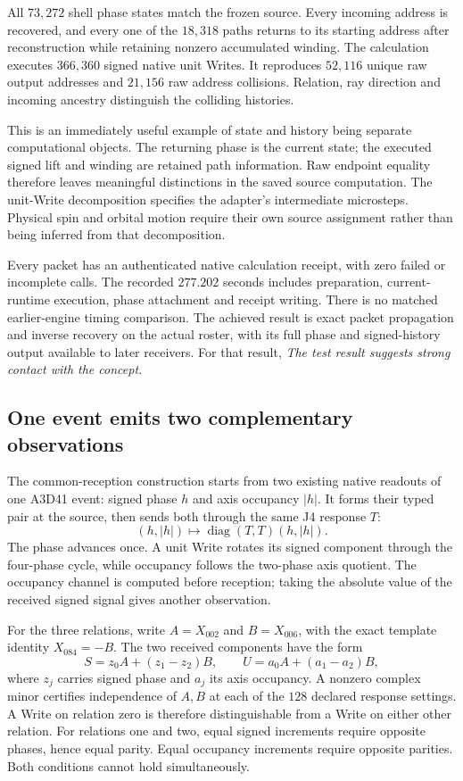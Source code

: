 All $73{,}272$ shell phase states match the frozen source. Every incoming address is recovered, and every one of the $18{,}318$ paths returns to its starting address after reconstruction while retaining nonzero accumulated winding. The calculation executes $366{,}360$ signed native unit Writes. It reproduces $52{,}116$ unique raw output addresses and $21{,}156$ raw address collisions. Relation, ray direction and incoming ancestry distinguish the colliding histories.

This is an immediately useful example of state and history being separate computational objects. The returning phase is the current state; the executed signed lift and winding are retained path information. Raw endpoint equality therefore leaves meaningful distinctions in the saved source computation. The unit-Write decomposition specifies the adapter's intermediate microsteps. Physical spin and orbital motion require their own source assignment rather than being inferred from that decomposition.

Every packet has an authenticated native calculation receipt, with zero failed or incomplete calls. The recorded $277.202$ seconds includes preparation, current-runtime execution, phase attachment and receipt writing. There is no matched earlier-engine timing comparison. The achieved result is exact packet propagation and inverse recovery on the actual roster, with its full phase and signed-history output available to later receivers. For that result, \emph{The test result suggests strong contact with the concept.}

\subsection{One event emits two complementary observations}

The common-reception construction starts from two existing native readouts of one A3D41 event: signed phase $h$ and axis occupancy $|h|$. It forms their typed pair at the source, then sends both through the same J4 response $T$:
\[
 (h,|h|)\longmapsto\operatorname{diag}(T,T)(h,|h|).
\]
The phase advances once. A unit Write rotates its signed component through the four-phase cycle, while occupancy follows the two-phase axis quotient. The occupancy channel is computed before reception; taking the absolute value of the received signed signal gives another observation. 

For the three relations, write $A=X_{002}$ and $B=X_{006}$, with the exact template identity $X_{084}=-B$. The two received components have the form
\[
 S=z_0A+(z_1-z_2)B,
 \qquad U=a_0A+(a_1-a_2)B,
\]
where $z_j$ carries signed phase and $a_j$ its axis occupancy. A nonzero complex minor certifies independence of $A,B$ at each of the $128$ declared response settings. A Write on relation zero is therefore distinguishable from a Write on either other relation. For relations one and two, equal signed increments require opposite phases, hence equal parity. Equal occupancy increments require opposite parities. Both conditions cannot hold simultaneously. 

